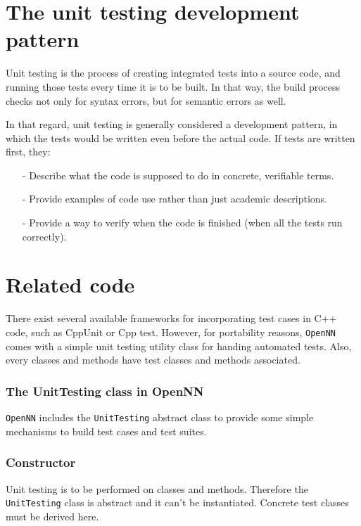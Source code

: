 \section*{The unit testing development pattern}

Unit testing is the process of creating integrated tests into a source code, and running those tests every time it is to be built. In that way, the build process checks not only for syntax errors, but for semantic errors as well. 

In that regard, unit testing is generally considered a development pattern, in which the tests would be written even before the actual code. If tests are written first, they:

\begin{itemize}
\item[-] Describe what the code is supposed to do in concrete, verifiable terms.
\item[-] Provide examples of code use rather than just  academic descriptions. 
\item[-] Provide a way to verify when the code is finished (when all the tests run correctly). 
\end{itemize}

\section*{Related code}

There exist several available frameworks for incorporating test cases in C++ code, such as CppUnit or Cpp test. 
However, for portability reasons, \texttt{OpenNN} comes with a simple unit testing utility class for handing automated tests. 
Also, every classes and methods have test classes and methods associated. 

\subsubsection*{The UnitTesting class in OpenNN}

\texttt{OpenNN} includes the \lstinline"UnitTesting" abstract class to provide some simple mechanisms to build test cases and test suites.

\subsubsection*{Constructor}

Unit testing is to be performed on classes and methods. Therefore the \lstinline"UnitTesting" class is abstract and it can't be instantiated. Concrete test classes must be derived here. 

